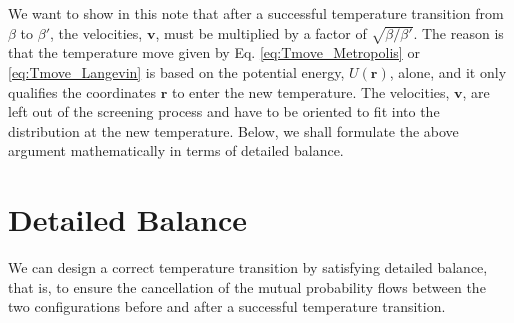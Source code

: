 \documentclass[11pt]{article}
\begin{document}
We want to show in this note that after a successful
temperature transition from $\beta$ to $\beta'$,
the velocities, $\mathbf v$, must be multiplied by
a factor of $\sqrt{ \beta / \beta' }$.
%
The reason is that the temperature move
given by Eq. \eqref{eq:Tmove_Metropolis}
or \eqref{eq:Tmove_Langevin}
is based on the potential energy, $U(\mathbf r)$, alone,
%
and it only qualifies the coordinates $\mathbf r$
to enter the new temperature.
%
The velocities, $\mathbf v$, are left out of
the screening process
and have to be oriented to fit into
the distribution at the new temperature.
%
Below, we shall formulate the above argument
mathematically in terms of detailed balance.


\section{Detailed Balance}


We can design a correct temperature transition
by satisfying detailed balance,
that is, to ensure the cancellation
of the mutual probability flows between
the two configurations before and after
a successful temperature transition.
\end{document}

